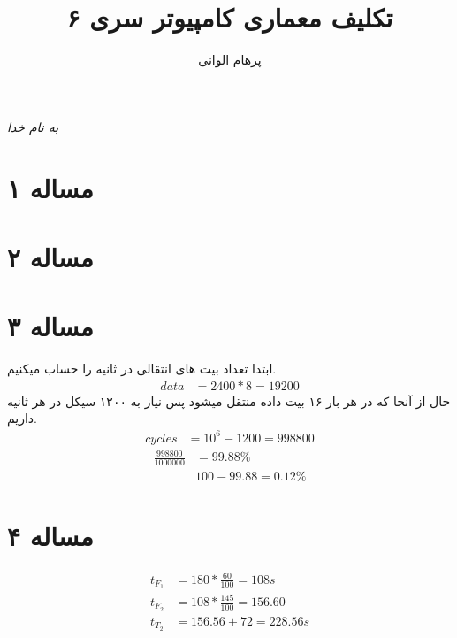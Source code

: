 \documentclass[11pt]{article}
\author{پرهام الوانی}
\title{تکلیف معماری کامپیوتر سری ۶}
\begin{document}
\begin{titlepage}
\begin{center}
\emph{به نام خدا}
\end{center}
\maketitle
\begin{center}
\end{center}
\end{titlepage}
\tableofcontents
\newpage
\section{مساله ۱}

\section{مساله ۲}
\section{مساله ۳}
ابتدا تعداد بیت های انتقالی در ثانیه را حساب میکنیم.
\begin{align*}
	data &= 2400 * 8 = 19200
\end{align*}
حال از آنحا که در هر بار ۱۶ بیت داده منتقل میشود پس نیاز به ۱۲۰۰ سیکل در هر ثانیه داریم.
\begin{align*}
	cycles &= 10^6 - 1200 = 998800
\end{align*}
\begin{align*}
	\frac{998800}{1000000} &= 99.88\% \\
	& 100 - 99.88 = 0.12\%
\end{align*}
\section{مساله ۴}
\begin{align*}
	t_{F_{1}} &= 180 * \frac{60}{100} = 108s \\
	t_{F_{2}} &= 108 * \frac{145}{100} = 156.60 \\
	t_{T_{2}} &= 156.56 + 72 = 228.56s
\end{align*}
\end{document}
